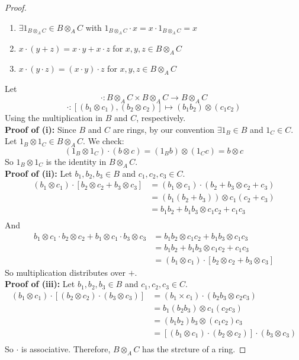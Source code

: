 \documentclass[hidelinks,12pt]{article}
\begin{document}
\begin{enumerate}[label=(\alph*).]
\begin{proof}
\begin{enumerate}[label=(\roman*).]
    \item \(\exists 1_{B\otimes_{A}C}\in B\otimes_{A}C\) with \(1_{B\otimes_{A}C}\cdot x=x\cdot 1_{B\otimes_{A}C}=x\)
    \item \(x\cdot(y+z)=x\cdot y+x\cdot z\) for \(x,y,z\in B\otimes_{A}C\)
    \item \(x\cdot(y\cdot z)=(x\cdot y)\cdot z\) for \(x,y,z\in B\otimes_{A}C\)
\end{enumerate}
Let 
\[
\cdot:B\otimes_{A}C\times B\otimes_{A}C\to B\otimes_{A}C
\]
\[
    \cdot:\left[(b_{1}\otimes c_{1}),(b_{2}\otimes c_{2})\right]\mapsto(b_{1}b_{2})\otimes(c_{1}c_{2})
\]
Using the multiplication in \(B\) and \(C\), respectively.\\
\textbf{Proof of (i):} Since \(B\) and \(C\) are rings, by our convention \(\exists 1_{B}\in B\) and \(1_{C}\in C\). Let \(1_{B}\otimes 1_{C}\in B\otimes_{A}C\). We check: \[
    (1_{B}\otimes 1_{C})\cdot (b\otimes c)=(1_{B}b)\otimes(1_{C}c)=b\otimes c
\]
So \(1_{B}\otimes 1_{C}\) is the identity in \(B\otimes_{A}C\).\\
\textbf{Proof of (ii):} Let \(b_{1},b_{2},b_{3}\in B\) and \(c_{1},c_{2},c_{3}\in C\).
\begin{align*}
    (b_{1}\otimes c_{1})\cdot\left[b_{2}\otimes c_{2}+b_{3}\otimes c_{3}\right]&=(b_{1}\otimes c_{1})\cdot(b_{2}+b_{3}\otimes c_{2}+c_{3})\\
&=(b_{1}(b_{2}+b_{3}))\otimes c_{1}(c_{2}+c_{3})\\
&=b_{1}b_{2}+b_{1}b_{3}\otimes c_{1}c_{2}+c_{1}c_{3}\\
\end{align*}
And
\begin{align*}
    b_{1}\otimes c_{1}\cdot b_{2}\otimes c_{2}+b_{1}\otimes c_{1}\cdot b_{3}\otimes c_{3}&=b_{1}b_{2}\otimes c_{1}c_{2}+b_{1}b_{3}\otimes c_{1}c_{3}\\
&=b_{1}b_{2}+b_{1}b_{3}\otimes c_{1}c_{2}+c_{1}c_{3}\\
&=(b_{1}\otimes c_{1})\cdot\left[b_{2}\otimes c_{2}+b_{3}\otimes c_{3}\right]
\end{align*}
So multiplication distributes over \(+\).\\
\textbf{Proof of (iii):} Let \(b_{1},b_{2},b_{3}\in B\) and \(c_{1},c_{2},c_{3}\in C\).
\begin{align*}
    (b_{1}\otimes c_{1})\cdot[(b_{2}\otimes c_{2})\cdot(b_{3}\otimes c_{3})]&=(b_{1}\times c_{1})\cdot(b_{2}b_{3}\otimes c_{2}c_{3})\\
&=b_{1}(b_{2}b_{3})\otimes c_{1}(c_{2}c_{3})\\
&=(b_{1}b_{2})b_{3}\otimes (c_{1}c_{2})c_{3}\\
&=[(b_{1}\otimes c_{1})\cdot(b_{2}\otimes c_{2})]\cdot(b_{3}\otimes c_{3})\\
\end{align*}
So \(\cdot\) is associative. Therefore, \(B\otimes_{A}C\) has the strcture of a ring.
\end{proof}
\end{enumerate}
\pagebreak
\end{document}
